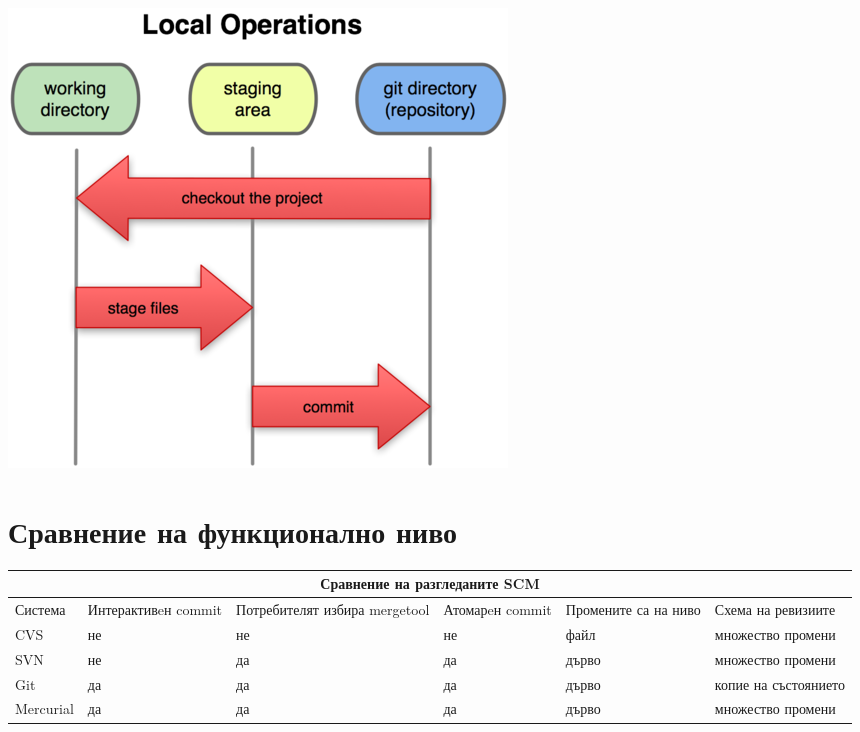 \documentclass[a4paper]{article}
\begin{document}
      \begin{center}
        \includegraphics[scale=1.0]{git_local_ops.png}
      \end{center}

\section{Сравнение на функционално ниво}
  \begin{tabular} { | l | p{22 mm} | p{21 mm} | p{14 mm} | p{17 mm} | p{34 mm} |}
  \multicolumn{6}{c}{Сравнение на разгледаните SCM} \\
  \hline
  Система     & Интерактивeн commit & Потребителят избира mergetool & Атомарeн commit & Промените са на ниво & Схема на ревизиите \\
  \hline
  CVS         & не                  & не                            & не              & файл                 & множество промени \\
  SVN         & не                  & да                            & да              & дърво                & множество промени \\
  Git         & да                  & да                            & да              & дърво                & копие на състоянието \\
  Mercurial   & да                  & да                            & да              & дърво                & множество промени\\
  \hline
  \end{tabular}
\end{document}
